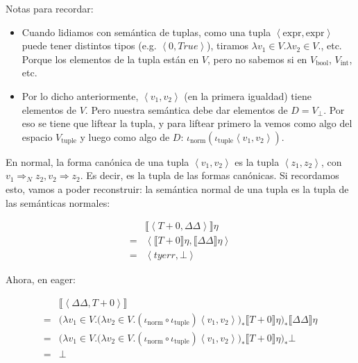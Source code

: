 \documentclass[article, 12pt]{article}
\begin{document}
Notas para recordar: 

\begin{itemize}
    \item Cuando lidiamos con semántica de tuplas, como una tupla
$\left<\text{expr}, \text{expr} \right>$ puede tener distintos tipos (e.g.
$\left<0, True \right>$), tiramos $\lambda v_1 \in V. \lambda v_2 \in V.$, etc.
Porque los elementos de la tupla están en $V$, pero no sabemos si en
$V_{\text{bool}}$, $V_{\text{int}}$, etc.

\item Por lo dicho anteriormente, $\left< v_1, v_2 \right>$ (en la primera
    igualdad) tiene elementos de $V$. Pero nuestra semántica debe dar elementos
    de $D = V_\bot$. Por eso se tiene que liftear la tupla, y para liftear
    primero la vemos como algo del espacio $V_{\text{tuple}}$ y luego como algo
    de $D$: $\iota_{\text{norm}}(\iota_{\text{tuple}}\left<v_1,v_2 \right>)$.
\end{itemize}

En normal, la forma canónica de una tupla
$\left<v_1, v_2 \right>$ es la tupla $\left<z_1, z_2 \right>$, con $v_1
\Rightarrow_N z_2, v_2 \Rightarrow z_2$. Es decir, es la tupla de las formas
canónicas. Si recordamos esto, vamos a poder reconstruir: la semántica normal de
una tupla es la tupla de las semánticas normales:

\begin{align*}
 &\llbracket \left<T + 0, \Delta\Delta \right> \rrbracket\eta \\ 
=&\left< \llbracket T +0 \rrbracket\eta, \llbracket \Delta\Delta
\rrbracket\eta\right> \\ 
=&\left<tyerr, \bot  \right>
\end{align*}

Ahora, en eager:

\begin{align*}
 &\llbracket \left<\Delta \Delta, T + 0 \right> \rrbracket\\
=&\Big( \lambda v_1 \in V.\big( \lambda v_2 \in V. (\iota_{\text{norm}}
    \circ \iota_{\text{tuple}}) \left< v_1, v_2 \right> \big)_*\llbracket T + 0
\rrbracket\eta \Big)_*\llbracket \Delta\Delta \rrbracket\eta\\
=&\Big( \lambda v_1 \in V.\big( \lambda v_2 \in V. (\iota_{\text{norm}}
    \circ \iota_{\text{tuple}}) \left< v_1, v_2 \right> \big)_*\llbracket T + 0
\rrbracket\eta \Big)_* \bot \\
=&\bot 
\end{align*}
\end{document}
